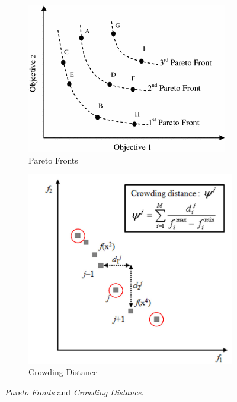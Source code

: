 \documentclass[format=acmsmall, review=false, screen=true]{acmart}
\begin{document}
\begin{figure}[H]
  \centering
  \begin{subfigure}[t]{0.55\textwidth}
    \includegraphics[width=\textwidth]{img/pareto_fronts.PNG}
    \caption{\label{fig:fronts}Pareto Fronts}
  \end{subfigure}
  \hfill
  \begin{subfigure}[t]{0.43\textwidth}
    \includegraphics[width=\textwidth]{img/crowding_distance.JPEG}
    \caption{\label{fig:endings}Crowding Distance}
  \end{subfigure}
  \caption{\textit{Pareto Fronts} and \textit{Crowding Distance}.}
  \label{fig:action-ending-diagram}
\end{figure}
\end{document}
